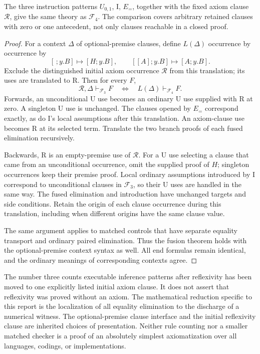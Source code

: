 \begin{theorem}
\label{fus:uniform-equivalence}
The three instruction patterns $U_{0,1}$, I, $E_{=}$, together with the fixed
axiom clause $\mathcal R$, give the same theory as $\mathcal F_4$. The
comparison covers arbitrary retained clauses with zero or one antecedent,
not only clauses reachable in a closed proof.
\end{theorem}
\begin{proof}
For a context $\Delta$ of optional-premise clauses, define $L(\Delta)$
occurrence by occurrence by
\[
 [\,;y.B]\longmapsto[H;y.B],\qquad
 [[A];y.B]\longmapsto[A;y.B].
\]
Exclude the distinguished initial axiom occurrence $\mathcal R$ from this
translation; its uses are translated to R. Then for every $F$,
\[
 \mathcal R,\Delta\vdash_{\mathcal F_3}F
 \quad\Longleftrightarrow\quad
 L(\Delta)\vdash_{\mathcal F_4}F.
\]
Forwards, an unconditional U use becomes an ordinary U use supplied with
R at zero. A singleton U use is unchanged. The clauses opened by $E_{=}$
correspond exactly, as do I's local assumptions after this translation.
An axiom-clause use becomes R at its selected term. Translate the two
branch proofs of each fused elimination recursively.

Backwards, R is an empty-premise use of $\mathcal R$. For a U use selecting
a clause that came from an unconditional occurrence, omit the supplied
proof of $H$; singleton occurrences keep their premise proof. Local
ordinary assumptions introduced by I correspond to unconditional clauses
in $\mathcal F_3$, so their U uses are handled in the same way.
The fused elimination and introduction have unchanged targets and
side conditions. Retain the origin of each clause occurrence during this
translation, including when different origins have the same clause value.

The same argument applies to matched controls that have separate equality
transport and ordinary paired elimination. Thus the fusion theorem holds
with the optional-premise context syntax as well. All end formulas remain
identical, and the ordinary meanings of corresponding contexts agree.
\end{proof}

The number three counts executable inference patterns after reflexivity
has been moved to one explicitly listed initial axiom clause. It does not
assert that reflexivity was proved without an axiom. The mathematical
reduction specific to this report is the localization of all equality
elimination to the discharge of a numerical witness. The optional-premise
clause interface and the initial reflexivity clause are inherited choices
of presentation. Neither rule counting nor a smaller matched checker is
a proof of an absolutely simplest axiomatization over all languages,
codings, or implementations.
